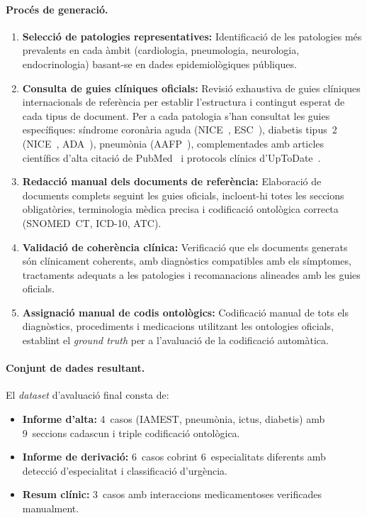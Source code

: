 \documentclass[CAT]{TFUOC}%
\begin{document}
\paragraph{Procés de generació.}
\begin{enumerate}
    \item \textbf{Selecció de patologies representatives:} Identificació de les patologies més prevalents en cada àmbit (cardiologia, pneumologia, neurologia, endocrinologia) basant-se en dades epidemiològiques públiques.
    
    \item \textbf{Consulta de guies clíniques oficials:} Revisió exhaustiva de guies clíniques internacionals de referència per establir l'estructura i contingut esperat de cada tipus de document. Per a cada patologia s'han consultat les guies específiques: síndrome coronària aguda (NICE~\cite{nice2020acs}, ESC~\cite{esc2023stemi}), diabetis tipus~2 (NICE~\cite{nice2015diabetes}, ADA~\cite{ada2023standards}), pneumònia (AAFP~\cite{aafp2022pneumonia}), complementades amb articles científics d'alta citació de PubMed~\cite{pubmed2023clinical} i protocols clínics d'UpToDate~\cite{uptodate2023guidelines}.
    
    \item \textbf{Redacció manual dels documents de referència:} Elaboració de documents complets seguint les guies oficials, incloent-hi totes les seccions obligatòries, terminologia mèdica precisa i codificació ontològica correcta (SNOMED~CT, ICD-10, ATC).
    
    \item \textbf{Validació de coherència clínica:} Verificació que els documents generats són clínicament coherents, amb diagnòstics compatibles amb els símptomes, tractaments adequats a les patologies i recomanacions alineades amb les guies oficials.
    
    \item \textbf{Assignació manual de codis ontològics:} Codificació manual de tots els diagnòstics, procediments i medicacions utilitzant les ontologies oficials, establint el \textit{ground truth} per a l'avaluació de la codificació automàtica.
\end{enumerate}

\paragraph{Conjunt de dades resultant.}
El \textit{dataset} d'avaluació final consta de:
\begin{itemize}
    \item \textbf{Informe d'alta:} 4~casos (IAMEST, pneumònia, ictus, diabetis) amb 9~seccions cadascun i triple codificació ontològica.
    \item \textbf{Informe de derivació:} 6~casos cobrint 6~especialitats diferents amb detecció d'especialitat i classificació d'urgència.
    \item \textbf{Resum clínic:} 3~casos amb interaccions medicamentoses verificades manualment.
\end{itemize}
\end{document}
